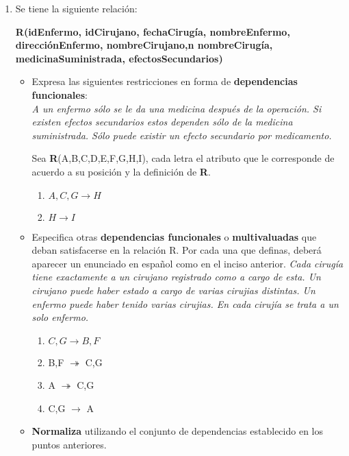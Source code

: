 \documentclass{article}
\begin{document}
\begin{enumerate}
\begin{itemize}
\begin{enumerate}
    	\end{enumerate}
    \end{itemize}
    
    	\item Se tiene la siguiente relación:   	
    	\begin{center}
    		 \textbf{R(idEnfermo, idCirujano, fechaCirugía, nombreEnfermo, direcciónEnfermo, nombreCirujano,n nombreCirugía, medicinaSuministrada, efectosSecundarios)}
    	\end{center}	 
    	
    \begin{itemize}
    	\item Expresa las siguientes restricciones en forma de \textbf{dependencias funcionales}:\\
    	\textit{A un enfermo sólo se le da una medicina después de la operación. Si existen efectos secundarios estos dependen sólo de 
    	la medicina suministrada. Sólo puede existir un efecto secundario por medicamento.}
    	
    	Sea \textbf{R}(A,B,C,D,E,F,G,H,I), cada letra el atributo que le corresponde de acuerdo a su posición y la definición de \textbf{R}.
    	\begin{enumerate}
    	    \item $A,C,G \rightarrow H$\\
    	    \item $H \rightarrow I$\\
    	\end{enumerate}
    	
    	\item Especifica  otras \textbf{dependencias  funcionales} o \textbf{multivaluadas} que  deban  satisfacerse  en  la relación R. 
    	Por cada una que definas, deberá aparecer un enunciado en español como en el inciso anterior.
    	\textit{Cada cirugía tiene exactamente a un cirujano registrado como a cargo de esta. Un cirujano puede haber estado a cargo de
    	varias cirujias distintas. Un enfermo puede haber tenido varias cirujias. En cada cirujía se trata a un solo enfermo.}
    	\begin{enumerate}
    	    \item $C,G \rightarrow B,F$\\
    	    \item B,F $\twoheadrightarrow$ C,G\\
    	    \item A $\twoheadrightarrow$ C,G\\
    	    \item C,G $\rightarrow$ A\\
    	\end{enumerate}
    	
    	\item \textbf{Normaliza} utilizando el conjunto de dependencias establecido en los puntos anteriores.
    \end{itemize}
    	
\end{enumerate}
\end{document}
